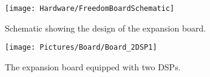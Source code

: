 \begin{figure}[H]
	\centering
	\texttt{[image: Hardware/FreedomBoardSchematic]}	
	\caption{Schematic showing the design of the expansion board.}
	\label{fig:PCBboardSchem}
\end{figure}


\begin{figure}[H]
	\centering
	\texttt{[image: Pictures/Board/Board\_2DSP1]}	
	\caption{The expansion board equipped with two DSPs.}
	\label{fig:PCBboard}
\end{figure}

